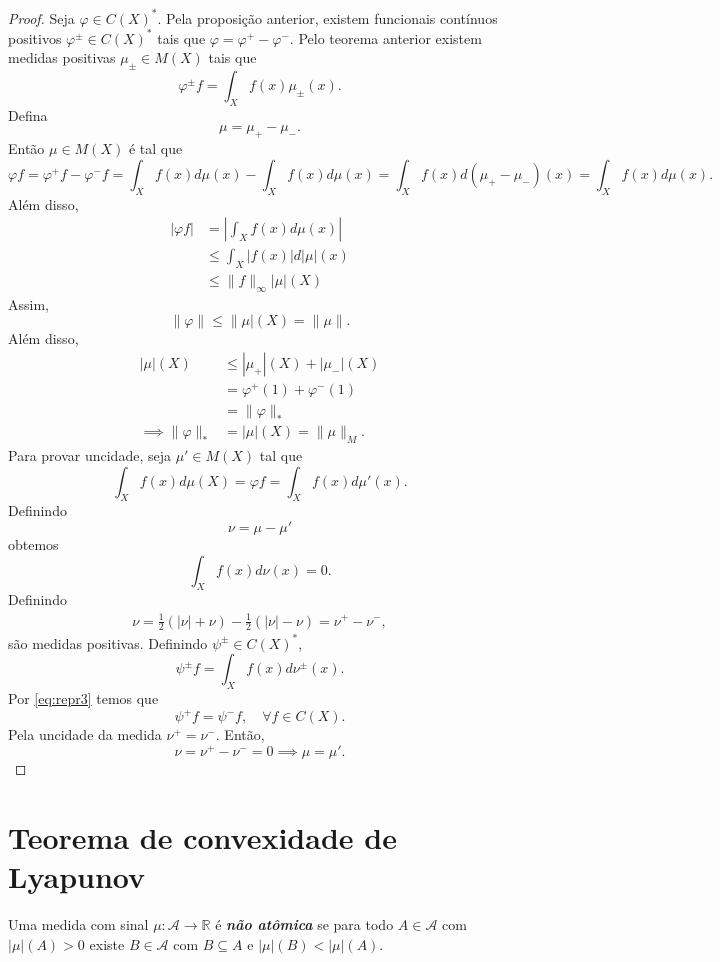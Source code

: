 \documentclass[portuguese]{article}
\theoremstyle{definition}
\newcommand{\R}{\mathbb{R}}
\begin{document}
\begin{proof}
	Seja $\varphi\in C(X)^*$. Pela proposição anterior, existem funcionais contínuos positivos $\varphi^\pm\in C(X)^*$ tais que $\varphi=\varphi^+-\varphi^-$. Pelo teorema anterior existem medidas positivas $\mu_\pm\in M(X)$ tais que
	\[\varphi^\pm f=\int_X f(x)\mu_\pm(x).\]
	Defina
	\[\mu=\mu_+-\mu_-.\]
	Então $\mu\in M(X)$ é tal que
	\[\varphi f=\varphi^+f-\varphi^-f=\int_Xf(x)d\mu(x)-\int_Xf(x)d\mu(x)=\int_Xf(x)d(\mu_+-\mu_-)(x)=\int_Xf(x)d\mu(x).\]
	Além disso, 
	\begin{align*}
		|\varphi f|&=\left|\int_Xf(x)d\mu(x)\right|\\
		&\leq\int_X|f(x)|d|\mu|(x)\\
		&\leq\|f\|_\infty|\mu|(X)
	\end{align*}
	Assim,
	\[\|\varphi\|\leq\|\mu|(X)=\|\mu\|.\]
	Além disso,
	\begin{align*}
		|\mu|(X)&\leq |\mu_+|(X)+|\mu_-|(X)\\
		&=\varphi^+(1)+\varphi^-(1)\\
		&=\|\varphi\|_*\\
		\implies\|\varphi\|_*&=|\mu|(X)=\|\mu\|_M.
	\end{align*}
	Para provar uncidade, seja $\mu'\in M(X)$ tal que
	\[\int_Xf(x)d\mu(X)=\varphi f=\int_Xf(x)d\mu'(x).\]
	Definindo
	\[\nu=\mu-\mu'\]
	obtemos
	\begin{equation}\label{eq:repr3}
		\int_Xf(x)d\nu(x)=0.
	\end{equation}
	Definindo
	\begin{align*}
		\nu=\frac{1}{2}(|\nu|+\nu)-\frac{1}{2}(|\nu|-\nu)=\nu^+-\nu^-,
	\end{align*}
	são medidas positivas. Definindo $\psi^\pm\in C(X)^*$,
	\[\psi^\pm f=\int_Xf(x)d\nu^\pm(x).\]
	Por \cref{eq:repr3} temos que
	\[\psi^+f=\psi^-f,\quad\forall f\in C(X).\]
	Pela uncidade da medida $\nu^+=\nu^-$. Então,
	\[\nu=\nu^+-\nu^-=0\implies\mu=\mu'.\]
\end{proof}

\section{Teorema de convexidade de Lyapunov}
\begin{defn}
	Uma medida com sinal $\mu:\mathcal{A}\to\R$ é \textbf{\textit{não atômica}} se para todo $A\in\mathcal{A}$ com $|\mu|(A)>0$ existe $B\in\mathcal{A}$ com $B\subseteq A$ e $|\mu|(B)<|\mu|(A)$.
\end{defn}
\end{document}
